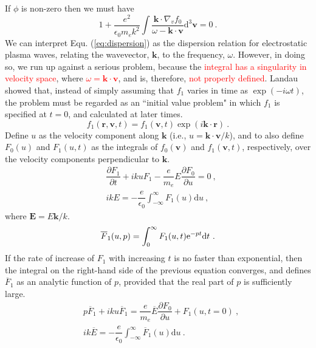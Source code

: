 \documentclass[12pt,a4paper]{article}
\renewcommand{\vec}[1]{\boldsymbol{#1}}
\newcommand{\dif}{\mathrm{d}}
\begin{document}
If $\phi$ is non-zero then we must have
\begin{equation}
1 + \dfrac{e^2}{\epsilon_0 m_e k^2} \int \dfrac{\vec{k}\cdot \nabla_v f_0}{\omega -\vec{k}\cdot \vec{v}} \dif^3 \vec{v} = 0 ~.
\label{eq:dispersion}
\end{equation}
We can interpret Equ. (\ref{eq:dispersion}) as the dispersion relation for electrostatic plasma waves, relating the wavevector, $\vec{k}$, to the frequency, $\omega$. However, in doing so, we run up against a serious problem, because the \textcolor{red}{integral has a singularity in velocity space}, where \textcolor{red}{$\omega = \vec{k}\cdot \vec{v}$}, and is, therefore, \textcolor{red}{not properly defined}. Landau showed that, instead of simply assuming that $f_1$ varies in time as $\exp(-i \omega t)$, the problem must be regarded as an ``initial value problem" in which $f_1$ is specified at $t = 0$, and calculated at later times. 
\begin{equation}
f_1(\vec{r}, \vec{v}, t) = f_1(\vec{v}, t) \exp (i\vec{k}\cdot \vec{r}) ~.
\end{equation}
Define $u$ as the velocity component along $\vec{k}$ (i.e., $u = \vec{k} \cdot \vec{v}/k$), and to also define $F_0(u)$ and $F_1(u, t)$ as the integrals of $f_0(\vec{v})$ and $f_1(\vec{v}, t)$, respectively, over the velocity components perpendicular to $\vec{k}$.
\begin{align}
& \dfrac{\partial F_1}{\partial t} +iku F_1 - \dfrac{e}{m_e} E \dfrac{\partial F_0}{\partial u}  = 0 ~, \\
& ik E = -\dfrac{e}{\epsilon_0} \int_{-\infty}^\infty F_1(u) \dif u ~,
\end{align}
where $\vec{E} = E\vec{k}/k$.
\begin{equation}
\overline{F}_1(u,p) = \int_0^\infty F_1(u,t) {\rm e}^{-pt} \dif t ~.
\end{equation}
If the rate of increase of $F_1$ with increasing $t$ is no faster than exponential, then the integral on the right-hand side of the previous equation converges, and defines $\overline{F}_1$ as an analytic function of $p$, provided that the real part of $p$ is sufficiently large.
\begin{align}
& p\overline{F}_1 +iku \overline{F}_1 = \dfrac{e}{m_e} \overline{E} \dfrac{\partial F_0}{\partial u} + F_1(u, t=0) ~, \\
& ik\overline{E} = -\dfrac{e}{\epsilon_0} \int_{-\infty}^\infty \overline{F}_1(u) \dif u ~.
\end{align}
\end{document}
